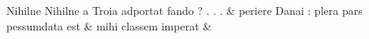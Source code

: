 \documentclass[12pt,onecolumn,twoside,a4paper]{memoir}
\begin{document}
\begin{pairs}
\begin{Leftside}
                              Nihilne
                              {Nihilne}
                              a
                              Troia
                              adportat
                              fando
                              ?
                              .
                              .
                              . \&
                         \stanza {}
                     periere
                              Danai
                              :
                              plera
                              pars
                              pessumdata
                              est \&
                         \stanza {}mihi
                              classem
                              imperat & 
                     

\end{Leftside}
\end{pairs}
\end{document}
